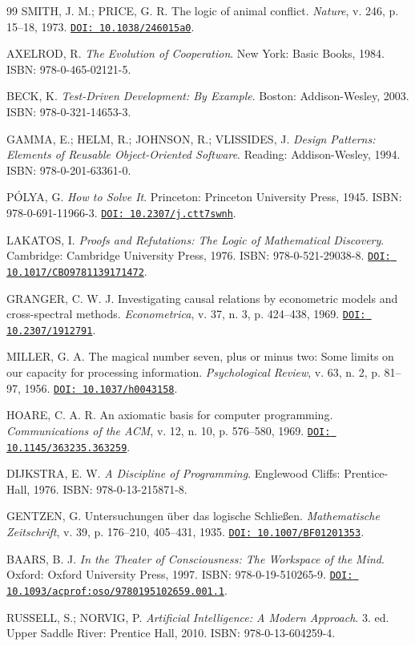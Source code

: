 \documentclass[12pt,a4paper,oneside]{abntex2}
\newcommand{\doi}[1]{\href{https://doi.org/#1}{\texttt{DOI: #1}}}
\begin{document}
\begin{thebibliography}{99}
SMITH, J. M.; PRICE, G. R. The logic of animal conflict. \textit{Nature}, v. 246, p. 15--18, 1973. \doi{10.1038/246015a0}.

AXELROD, R. \textit{The Evolution of Cooperation}. New York: Basic Books, 1984. ISBN: 978-0-465-02121-5.

BECK, K. \textit{Test-Driven Development: By Example}. Boston: Addison-Wesley, 2003. ISBN: 978-0-321-14653-3.

GAMMA, E.; HELM, R.; JOHNSON, R.; VLISSIDES, J. \textit{Design Patterns: Elements of Reusable Object-Oriented Software}. Reading: Addison-Wesley, 1994. ISBN: 978-0-201-63361-0.

PÓLYA, G. \textit{How to Solve It}. Princeton: Princeton University Press, 1945. ISBN: 978-0-691-11966-3. \doi{10.2307/j.ctt7swnh}.

LAKATOS, I. \textit{Proofs and Refutations: The Logic of Mathematical Discovery}. Cambridge: Cambridge University Press, 1976. ISBN: 978-0-521-29038-8. \doi{10.1017/CBO9781139171472}.

GRANGER, C. W. J. Investigating causal relations by econometric models and cross-spectral methods. \textit{Econometrica}, v. 37, n. 3, p. 424--438, 1969. \doi{10.2307/1912791}.

MILLER, G. A. The magical number seven, plus or minus two: Some limits on our capacity for processing information. \textit{Psychological Review}, v. 63, n. 2, p. 81--97, 1956. \doi{10.1037/h0043158}.

HOARE, C. A. R. An axiomatic basis for computer programming. \textit{Communications of the ACM}, v. 12, n. 10, p. 576--580, 1969. \doi{10.1145/363235.363259}.

DIJKSTRA, E. W. \textit{A Discipline of Programming}. Englewood Cliffs: Prentice-Hall, 1976. ISBN: 978-0-13-215871-8.

GENTZEN, G. Untersuchungen über das logische Schließen. \textit{Mathematische Zeitschrift}, v. 39, p. 176--210, 405--431, 1935. \doi{10.1007/BF01201353}.

BAARS, B. J. \textit{In the Theater of Consciousness: The Workspace of the Mind}. Oxford: Oxford University Press, 1997. ISBN: 978-0-19-510265-9. \doi{10.1093/acprof:oso/9780195102659.001.1}.

RUSSELL, S.; NORVIG, P. \textit{Artificial Intelligence: A Modern Approach}. 3. ed. Upper Saddle River: Prentice Hall, 2010. ISBN: 978-0-13-604259-4.


\end{thebibliography}
\end{document}
